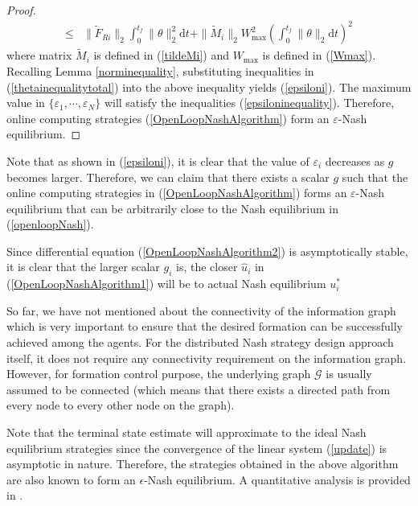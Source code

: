 \documentclass[12pt,draftcls,onecolumn]{IEEEtran}  %
\begin{document}
\begin{proof}
\begin{align*}
\leq&\|\tilde{F}_{Ri}\|_2\int^{t_f}_0
\|\theta\|_2^2\mbox{d}t+\|\tilde{M}_i\|_2 W^2_{\max} \left(\int^{t_f}_0\|\theta\|_2\mbox{d}t\right)^2
\end{align*}
where matrix $\tilde{M}_i$ is defined in (\ref{tildeMi}) and $W_{\max}$ is defined in (\ref{Wmax}). Recalling Lemma \ref{norminequality}, substituting inequalities in (\ref{thetainequalitytotal}) into the above inequality yields (\ref{epsiloni}). The maximum value in $\{\varepsilon_1,\cdots,\varepsilon_N\}$ will satisfy the inequalities (\ref{epsiloninequality}). Therefore, online computing strategies (\ref{OpenLoopNashAlgorithm}) form an $\varepsilon$-Nash equilibrium.
\end{proof}








Note that as shown in (\ref{epsiloni}), it is clear that the value of
$\varepsilon_i$ decreases as $g$ becomes larger. Therefore, we can claim that
there exists a scalar $g$ such that the online computing strategies in
(\ref{OpenLoopNashAlgorithm}) forms an $\varepsilon$-Nash equilibrium that can
be arbitrarily close to the Nash equilibrium in (\ref{openloopNash}).



Since differential equation (\ref{OpenLoopNashAlgorithm2})
is asymptotically stable, it is clear that the larger scalar $g_i$ is, the closer $\hat{u}_i$ in  (\ref{OpenLoopNashAlgorithm1}) will be to actual Nash equilibrium $u^*_i$










\begin{Rmk}
So far, we have not mentioned about the connectivity of the information graph which is very important to ensure that the desired formation can be successfully achieved among the agents. For the distributed Nash strategy design approach itself, it does not require any connectivity requirement on the information graph. However, for formation control purpose, the underlying graph $\mathcal{G}$ is usually assumed to be connected (which means that there exists a directed path from every node to every other node on the graph).
\end{Rmk}

{Note that the terminal state estimate will approximate to the ideal Nash equilibrium strategies since the convergence of the linear system (\ref{update}) is asymptotic in nature. Therefore, the strategies obtained in the above algorithm are also known to form an $\epsilon$-Nash equilibrium. A quantitative analysis is provided in \cite{LinThesis}.}
\end{document}
